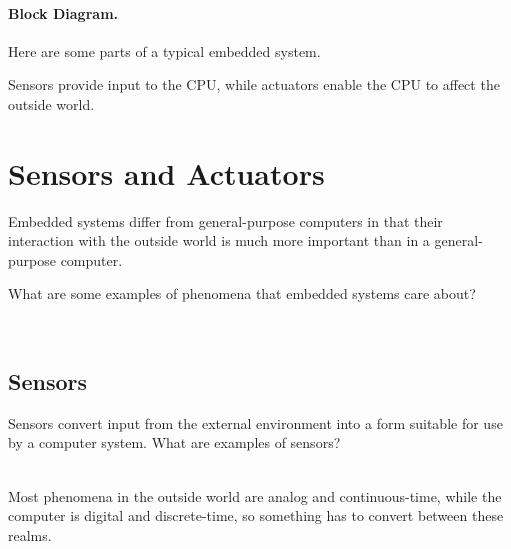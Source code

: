 \paragraph{Block Diagram.} Here are some parts of a typical
embedded system.

\begin{center}
\end{center}
Sensors provide input to the CPU, while actuators enable the CPU
to affect the outside world.

\section*{Sensors and Actuators}
Embedded systems differ from general-purpose computers in that their
interaction with the outside world is much more important than in a
general-purpose computer.

{\sf What are some examples of phenomena that embedded systems care about?}

~\\[1em]


\subsection*{Sensors} Sensors convert input from the external environment
into a form suitable for use by a computer system.
{\sf What are examples of sensors?}


~\\

Most phenomena in the outside world are analog and continuous-time,
while the computer is digital and discrete-time, so something has to
convert between these realms.

